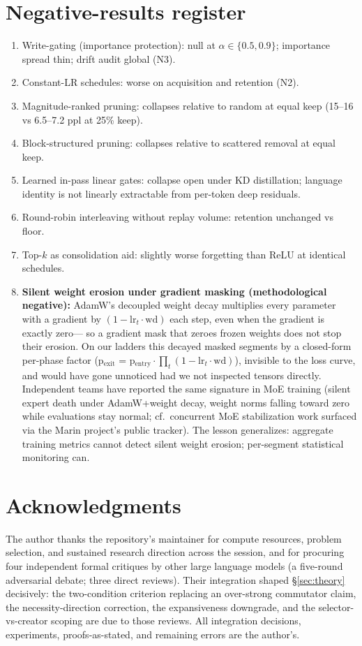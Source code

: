 \documentclass[11pt]{article}
\theoremstyle{definition}\newtheorem{definition}{Definition}
\theoremstyle{remark}\newtheorem{remark}{Remark}
\begin{document}
\section{Negative-results register}
\begin{enumerate}\itemsep2pt
\item Write-gating (importance protection): null at $\alpha\in\{0.5,0.9\}$; importance
spread thin; drift audit global (N3).
\item Constant-LR schedules: worse on acquisition and retention (N2).
\item Magnitude-ranked pruning: collapses relative to random at equal keep (15--16 vs
6.5--7.2 ppl at 25\% keep).
\item Block-structured pruning: collapses relative to scattered removal at equal keep.
\item Learned in-pass linear gates: collapse open under KD distillation; language identity
is not linearly extractable from per-token deep residuals.
\item Round-robin interleaving without replay volume: retention unchanged vs floor.
\item Top-$k$ as consolidation aid: slightly worse forgetting than ReLU at identical
schedules.
\item \textbf{Silent weight erosion under gradient masking (methodological negative):}
AdamW's decoupled weight decay multiplies every parameter with a gradient by
$(1-\mathrm{lr}_t\cdot\mathrm{wd})$ each step, even when the gradient is exactly zero---
so a gradient mask that zeroes frozen weights does not stop their erosion. On our
ladders this decayed masked segments by a closed-form per-phase factor
(p$_{\text{exit}}$ = p$_{\text{entry}}\cdot\prod_t(1-\mathrm{lr}_t\cdot\mathrm{wd})$),
invisible to the loss curve, and would have gone unnoticed had we not inspected
tensors directly. Independent teams have reported the same signature in MoE training
(silent expert death under AdamW+weight decay, weight norms falling toward zero while
evaluations stay normal; cf.\ concurrent MoE stabilization work surfaced via the Marin
project's public tracker). The lesson generalizes: aggregate training metrics cannot
detect silent weight erosion; per-segment statistical monitoring can.
\end{enumerate}

\section*{Acknowledgments}
The author thanks the repository's maintainer for compute resources, problem selection, and
sustained research direction across the session, and for procuring four independent formal
critiques by other large language models (a five-round adversarial debate; three direct
reviews). Their integration shaped \S\ref{sec:theory} decisively: the two-condition criterion replacing an
over-strong commutator claim, the necessity-direction correction, the expansiveness
downgrade, and the selector-vs-creator scoping are due to those reviews. All integration
decisions, experiments, proofs-as-stated, and remaining errors are the author's.
\end{document}
